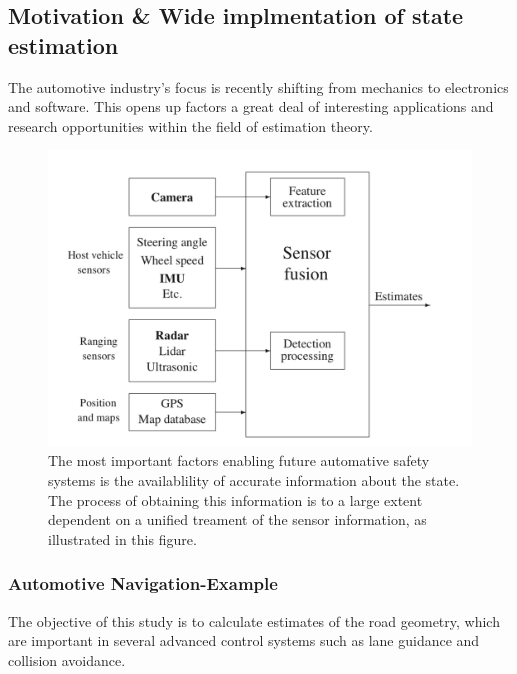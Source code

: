 \documentclass[11pt,oneside,a4paper]{article}
\begin{document}
\subsection{Motivation \& Wide implmentation of state estimation}
The automotive industry's focus is recently shifting from mechanics to electronics and software. This opens up factors
a great deal of interesting applications and research opportunities within the field of estimation theory.
\begin{figure}[H]
  \begin{center}
  \includegraphics[height=0.3\textheight]{./source/1.png}
  \end{center}
  \caption{ The most important factors enabling future automative safety systems
  is the availablility of accurate information about the state. The process of obtaining
  this information is to a large extent dependent on a unified treament of the sensor information, as illustrated
  in this figure.}
  \label{}
\end{figure}
\subsubsection{Automotive Navigation-Example}
The objective of this study is to calculate estimates of the road geometry,
which are important in several advanced control systems such as lane guidance
and collision avoidance.
\end{document}
